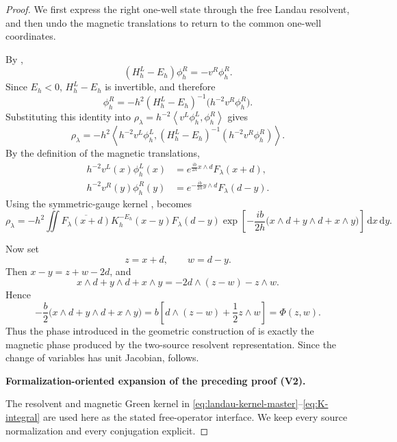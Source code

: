 \documentclass[11pt]{article}
\newcommand{\formalisationparentid}{X}
\newenvironment{formalisationaddition}[1]{\par\medskip\begingroup\color{blue}\def\formalisationparentid{#1}\setcounter{formalizationsublemma}{0}\let\lemma\formalizationsublemma\let\endlemma\endformalizationsublemma
  \def\Eo{\mathcal E_h^\circ}\def\EE{\mathcal E_h}\def\phio{\phi_h^\circ}\def\phih{\phi_h}\def\Ho{H_h^{\rm atom}(v^\circ)}\def\Ha{H_h^{\rm atom}}\def\HL{H_h^{L}}\def\Dh{D_h}\def\Log{\operatorname{Log}}\def\ellh{\ell_h}\def\Gp{G_{p,h}}\def\Ast{A_{*,h}}\def\ahat{\widehat{\mathfrak a}_h}\def\ah{\mathfrak a_h}\def\rh{\widehat\rho_h}\def\deltah{\widehat\delta_h}\def\oldref##1{\textup{(##1)}}\def\interface##1{\par\noindent\textit{Analytical interface used here.} ##1\par}\def\finish{\par\noindent\textit{Conclusion of the formalization-oriented expansion.} }\par\noindent\textbf{Formalization-oriented expansion of the preceding proof (V2).}\par\smallskip
}{\par\endgroup\medskip
}
\newcommand{\dd}{\,\mathrm d}
\newcommand{\ip}[2]{\left\langle #1,#2\right\rangle}
\newcommand{\wedgep}{\mathbin{\wedge}}
\begin{document}
\begin{proof}
We first express the right one-well state through the free Landau resolvent,
and then undo the magnetic translations to return to the common one-well
coordinates.

By ,
\[
 (H_h^L-E_h)\phi_h^R=-v^R\phi_h^R.
\]
Since $E_h<0$, $H_h^L-E_h$ is invertible, and therefore
\begin{equation}\label{eq:right-source-eq}
 \phi_h^R
 =-h^2(H_h^L-E_h)^{-1}
 \bigl(h^{-2}v^R\phi_h^R\bigr).
\end{equation}
Substituting this identity into
$\rho_\lambda=h^{-2}\ip{v^L\phi_h^L}{\phi_h^R}$ gives
\begin{equation}\label{eq:rho-resolvent-intermediate}
 \rho_\lambda
 =-h^2
 \ip{h^{-2}v^L\phi_h^L}
 {(H_h^L-E_h)^{-1}(h^{-2}v^R\phi_h^R)}.
\end{equation}
By the definition of the magnetic translations,
\begin{align}
 h^{-2}v^L(x)\phi_h^L(x)
 &=e^{\frac{ib}{2h}x\wedgep d}F_\lambda(x+d),\\
 h^{-2}v^R(y)\phi_h^R(y)
 &=e^{-\frac{ib}{2h}y\wedgep d}F_\lambda(d-y).
\end{align}
Using the symmetric-gauge kernel ,
 becomes
\[
 \rho_\lambda
 =-h^2\iint
 \overline{F_\lambda(x+d)}
 K_h^{-E_h}(x-y)
 F_\lambda(d-y)
 \exp\!\left[
 -\frac{ib}{2h}
 \bigl(x\wedgep d+y\wedgep d+x\wedgep y\bigr)
 \right]
 \dd x\dd y .
\]

Now set
\[
 z=x+d,\qquad w=d-y.
\]
Then $x-y=z+w-2d$, and
\[
 x\wedgep d+y\wedgep d+x\wedgep y
 =-2d\wedgep(z-w)-z\wedgep w.
\]
Hence
\[
 -\frac b2
 \bigl(x\wedgep d+y\wedgep d+x\wedgep y\bigr)
 =
 b\left[d\wedgep(z-w)+\frac12z\wedgep w\right]
 =\Phi(z,w).
\]
Thus the phase introduced in the geometric construction of  is exactly the magnetic phase produced by the two-source resolvent representation. Since the change of variables has unit Jacobian,
 follows.

\begin{formalisationaddition}{P5.1}
The resolvent and magnetic Green kernel in \eqref{eq:landau-kernel-master}--\eqref{eq:K-integral} are used here as the stated free-operator interface. We keep every source normalization and every conjugation explicit.


\end{formalisationaddition}
\end{proof}
\end{document}

